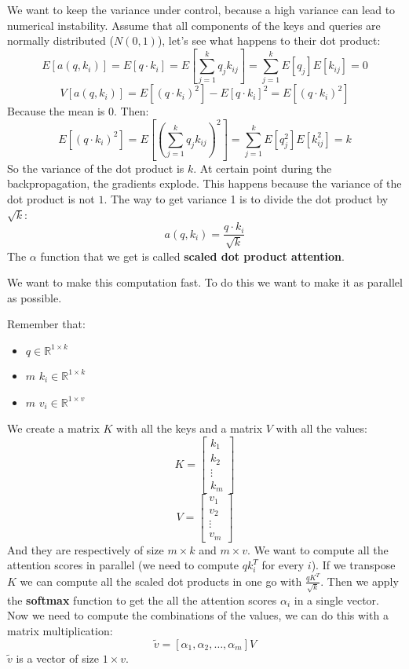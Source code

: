 We want to keep the variance under control, because a high variance can lead to numerical instability.
Assume that all components of the keys and queries are normally distributed ($N(0,1)$), let's see what happens to their dot product:
\[
    E[a(q,k_i)]=E[q\cdot k_i]=E\left[\sum_{j=1}^{k}q_jk_{ij}\right]=\sum_{j=1}^{k}E[q_j]E[k_{ij}]=0
\]
\[
    V[a(q,k_i)]=E[(q\cdot k_i)^2]-E[q\cdot k_i]^2=E[(q\cdot k_i)^2]
\]
Because the mean is $0$. Then:
\[
    E[(q\cdot k_i)^2]=E\left[(\sum_{j=1}^{k}q_jk_{ij})^2\right]=\sum_{j=1}^{k}E[q_j^2]E[k_{ij}^2]=k
\]
So the variance of the dot product is $k$.
At certain point during the backpropagation, the gradients explode. This happens because the variance of the dot product is not $1$.
The way to get variance 1 is to divide the dot product by $\sqrt{k}$:
\[
    a(q,k_i)=\frac{q\cdot k_i}{\sqrt{k}}
\]
The $\alpha$ function that we get is called \textbf{scaled dot product attention}.

We want to make this computation fast. To do this we want to make it as parallel as possible.

Remember that:
\begin{itemize}
    \item $q\in\mathbb{R}^{1\times k}$
    \item $m$ $k_i\in\mathbb{R}^{1\times k}$
    \item $m$ $v_i\in\mathbb{R}^{1\times v}$
\end{itemize}

We create a matrix $K$ with all the keys and a matrix $V$ with all the values:
\[
    K=\begin{bmatrix}
        k_1\\
        k_2\\
        \vdots\\
        k_m
    \end{bmatrix}
\]
\[
    V=\begin{bmatrix}
        v_1\\
        v_2\\
        \vdots\\
        v_m
    \end{bmatrix}
\]
And they are respectively of size $m\times k$ and $m\times v$.
We want to compute all the attention scores in parallel (we need to compute $qk_i^T$ for every $i$).
If we transpose $K$ we can compute all the scaled dot products in one go with $\frac{qK^T}{\sqrt{k}}$.
Then we apply the \textbf{softmax} function to get the all the attention scores $\alpha_i$ in a single vector.
Now we need to compute the combinations of the values, we can do this with a matrix multiplication:
\[
    \tilde{v}=[\alpha_1,\alpha_2,\ldots,\alpha_m]V
\]
$\tilde{v}$ is a vector of size $1\times v$.

